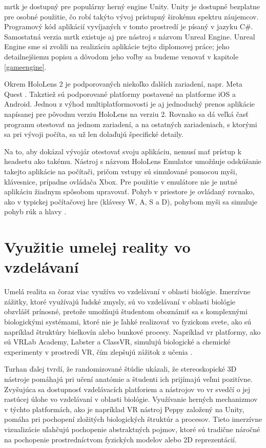 \acrshort{mrtk} je dostupný pre populárny herný engine Unity. Unity je dostupné bezplatne pre osobné použitie, čo robí takýto vývoj prístupný širokému spektru záujemcov.
Programový kód aplikácií vyvíjaných v tomto prostredí je písaný v jazyku C\#. Samostatná verzia \acrshort{mrtk} existuje aj pre nástroj s názvom Unreal Engine. Unreal
Engine sme si zvolili na realizáciu aplikácie tejto diplomovej práce; jeho detailnejšiemu popisu a dôvodom jeho voľby sa budeme venovať v kapitole \ref{gameengine}.

Okrem HoloLens 2 je podporovaných niekoľko ďalších zariadení, napr. Meta Quest \cite{microsoftWhatMixedReality}. Takztiež sú podporované platformy postavené na platforme
iOS a Android. Jednou z výhod multiplatformovosti je aj jednoduchý prenos aplikácie napísanej pre pôvodnu verziu HoloLens na verziu 2. Rovnako sa dá veľká časť programu
otestovať na jednom zariadení, a na ostatných zariadeniach, s ktorými sa pri vývoji počíta, sa už len dolaďujú špecifické detaily.

Na to, aby dokázal vývojár otestovať svoju aplikáciu, nemusí mať prístup k headsetu ako takému. Nástroj s názvom HoloLens Emulator umožňuje odskúšanie takejto aplikácie 
na počítači, pričom vstupy sú simulované pomocou myši, klávesnice, prípadne ovládača Xbox. Pre použitie v emulátore nie je nutné aplikáciu žiadnym spôsobom upravovať. 
Pohyb v priestore je ovládaný rovnako, ako v typickej počítačovej hre (klávesy W, A, S a D), pohybom myši sa simuluje pohyb rúk a hlavy \cite{microsoftUsingHoloLensEmulator}.

\section{Využitie umelej reality vo vzdelávaní}
Umelá realita sa čoraz viac využíva vo vzdelávaní v oblasti biológie. Imerzívne zážitky, ktoré využívajú ľudské zmysly, sú vo vzdelávaní v oblasti biológie obzvlášť prínosné, 
pretože umožňujú študentom oboznámiť sa s komplexnými biologickými systémami, ktoré nie je ľahké realizovať vo fyzickom svete, ako sú napríklad štruktúry bielkovín alebo bunkové procesy. 
Napríklad \acrshort{vr} platformy, ako sú VRLab Academy, Labster a ClassVR, simulujú biologické a chemické experimenty v prostredí VR, čím zlepšujú zážitok z učenia \cite{turhanBraveNewWorld2022}.

Turhan ďalej tvrdí, že randomizované štúdie ukázali, že stereoskopické 3D nástroje pomáhajú pri učení anatómie a študenti ich prijímajú veľmi pozitívne. Zvyšujúca sa dostupnosť vzdelávacích platforiem 
a nástrojov vo \acrshort{vr} svedčí o jej rastúcej úlohe vo vzdelávaní v oblasti biológie. Využívanie herných mechanizmov v týchto platformách, ako je napríklad VR nástroj Peppy založený na Unity, 
pomáha pri pochopení zložitých biologických štruktúr a procesov. Tieto imerzívne vizualizácie uľahčujú pochopenie abstraktných pojmov, ktoré sú tradične náročné na pochopenie 
prostredníctvom fyzických modelov alebo 2D reprezentácií.

